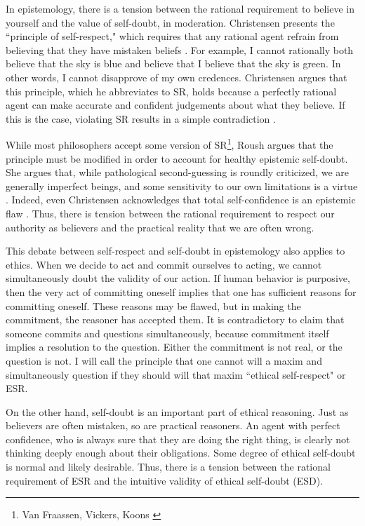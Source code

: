 \begin{isabellebody}
\begin{isamarkuptext}
In epistemology, there is a tension between the rational requirement to believe in yourself and the 
value of self-doubt, in moderation. Christensen presents the ``principle of self-respect," which requires 
that any rational agent refrain from believing that they have mistaken beliefs \cite[4]{christensen}. For example, I cannot 
rationally both believe that the sky is blue and believe that I believe that the sky is green. In other words, I cannot 
disapprove of my own credences. Christensen argues that this principle, which he abbreviates to SR, holds because 
a perfectly rational agent can make accurate and confident judgements about what they believe. If this 
is the case, violating SR results in a simple contradiction \cite[8-9]{christensen}. 

While most philosophers accept some version of SR\footnote{Van Fraassen, Vickers, Koons \cite[5]{christensen}}, 
Roush argues that the principle must be modified in order to account for healthy epistemic 
self-doubt. She argues that, while pathological second-guessing is roundly criticized, we are generally 
imperfect beings, and some sensitivity to our own limitations is a virtue \cite[2]{roushselfhelp}. Indeed, even Christensen 
acknowledges that total self-confidence is an epistemic flaw \cite[1]{christensen}. Thus, there is tension between the rational
requirement to respect our authority as believers and the practical reality that we are often wrong. 

This debate between self-respect and self-doubt in epistemology also applies to ethics. When we 
decide to act and commit ourselves to acting, we cannot simultaneously doubt the 
validity of our action. If human behavior is purposive, then the very act of committing oneself implies 
that one has sufficient reasons for committing oneself. These reasons may be flawed, but in making the 
commitment, the reasoner has accepted them. It is contradictory to claim that someone commits and questions 
simultaneously, because commitment itself implies a resolution to the question. Either the commitment 
is not real, or the question is not. I will call the principle that 
one cannot will a maxim and simultaneously question if they should will that maxim
``ethical self-respect" or ESR.

On the other hand, self-doubt is an important part of ethical reasoning. Just as believers are often 
mistaken, so are practical reasoners. An agent with perfect confidence, who is always sure that they 
are doing the right thing, is clearly not thinking deeply enough about their obligations. Some degree
of ethical self-doubt is normal and likely desirable. Thus, there is a tension between the rational
requirement of ESR and the intuitive validity of ethical self-doubt (ESD).


\end{isamarkuptext}
\end{isabellebody}
